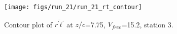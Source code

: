 \begin{figure}[H]
\centering
\texttt{[image: figs/run\_21/run\_21\_rt\_contour]}
\caption{Contour plot of $\overline{r^\prime t^\prime}$ at $z/c$=7.75, $V_{free}$=15.2, station 3.}
\label{fig:run_21_rt_contour}
\end{figure}


